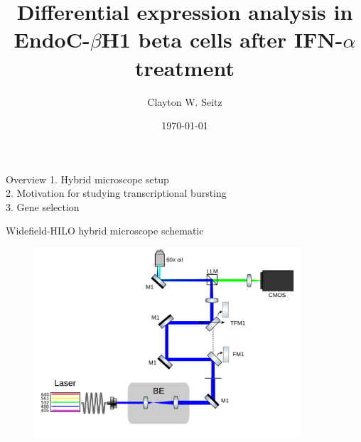 \documentclass{beamer}					%
\title{Differential expression analysis in EndoC-$\beta$H1 beta cells after IFN-$\alpha$ treatment}	%
\author{Clayton W. Seitz}								%
\date{\today}									%
\begin{document}
\begin{frame}
  \titlepage
\end{frame}


%

\begin{frame}{Overview}
1. Hybrid microscope setup\\
2. Motivation for studying transcriptional bursting\\
3. Gene selection\\
\end{frame}

\begin{frame}{Widefield-HILO hybrid microscope schematic}


\begin{figure}
\includegraphics[width=10cm]{epi-hilo.png}
\end{figure}

\end{frame}
\end{document}
